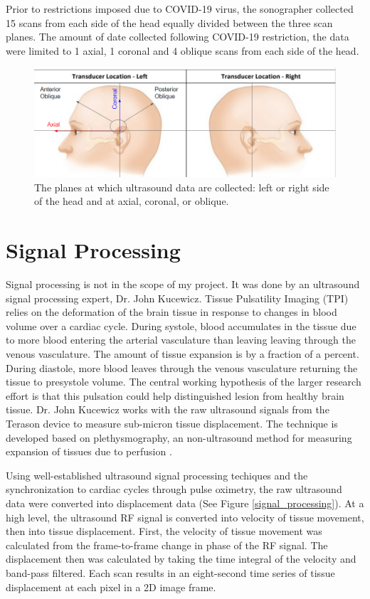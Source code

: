 \documentclass [11pt, proquest] {uwthesis}[2020/02/24]
\begin{document}
Prior to restrictions imposed due to COVID-19 virus, the sonographer collected 15 scans from each side of the head equally divided between
the three scan planes. The amount of date collected following COVID-19 restriction, the data were limited to 1 axial, 1 coronal and 4 oblique
scans from each side of the head.

\begin{figure}
  \centering
  \includegraphics[width=1\linewidth]{figures/ultrasound_angle.png}
  \caption{The planes at which ultrasound data are collected: left or right side of the head and at axial, coronal, or oblique.}
  \label{ultrasound_angle}
\end{figure}

\section{Signal Processing}

Signal processing is not in the scope of my project. It was done by an ultrasound signal processing expert, Dr. John Kucewicz.
Tissue Pulsatility Imaging (TPI) relies on the deformation of the brain tissue in response to changes in 
blood volume over a cardiac cycle. During systole, blood accumulates in the tissue due to more blood entering the arterial 
vasculature than leaving leaving through the venous vasculature. The amount of tissue expansion is by a fraction of a percent.
During diastole, more blood leaves through the venous vasculature returning the tissue to presystole volume\cite{hemodynamics, pulsatile_echo}.
The central working hypothesis of the larger research effort is that this pulsation could help distinguished lesion from
healthy brain tissue. Dr. John Kucewicz works with the raw ultrasound signals from the Terason device to measure sub-micron
tissue displacement. The technique is developed based on plethysmography, an non-ultrasound method for measuring expansion of tissues
due to perfusion \cite{kucewicz_tissue_2008}.

Using well-established ultrasound signal processing techiques and the synchronization to cardiac cycles through pulse oximetry,
the raw ultrasound data were converted into displacement data (See Figure \ref{signal_processing}). At a high level, the ultrasound RF signal 
is converted into velocity of tissue movement, then into tissue displacement. First, the velocity of tissue movement was calculated from the 
frame-to-frame change in phase of the RF signal. The displacement then was calculated by taking the time integral of the velocity and 
band-pass filtered. Each scan results in an eight-second time series of tissue displacement at each pixel in a 2D image frame.
\end{document}
